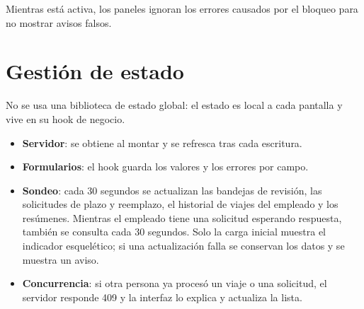 \documentclass[11pt,letterpaper]{article}
\begin{document}
Mientras está activa, los paneles ignoran los errores causados por el bloqueo para no mostrar avisos falsos.

\section{Gestión de estado}
No se usa una biblioteca de estado global: el estado es local a cada pantalla y vive en su hook de negocio.

\begin{itemize}
  \item \textbf{Servidor}: se obtiene al montar y se refresca tras cada escritura.
  \item \textbf{Formularios}: el hook guarda los valores y los errores por campo.
  \item \textbf{Sondeo}: cada 30 segundos se actualizan las bandejas de revisión, las solicitudes de plazo y reemplazo, el historial de viajes del empleado y los resúmenes. Mientras el empleado tiene una solicitud esperando respuesta, también se consulta cada 30 segundos. Solo la carga inicial muestra el indicador esquelético; si una actualización falla se conservan los datos y se muestra un aviso.
  \item \textbf{Concurrencia}: si otra persona ya procesó un viaje o una solicitud, el servidor responde 409 y la interfaz lo explica y actualiza la lista.
\end{itemize}
\end{document}
